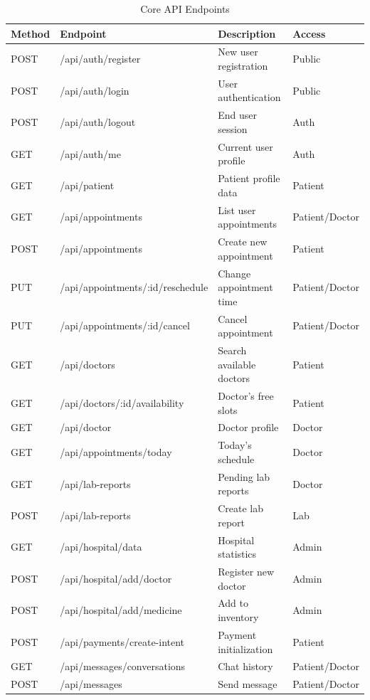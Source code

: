 \begin{table}[H]
\small
\centering
\caption{Core API Endpoints}
\label{tab:api-endpoints}
\renewcommand{\arraystretch}{1.3}
\begin{tabular}{|>{\raggedright\arraybackslash}p{1.6cm}|>{\raggedright\arraybackslash}p{5.1cm}|>{\raggedright\arraybackslash}p{4.2cm}|>{\raggedright\arraybackslash}p{2.9cm}|}
\hline
\textbf{Method} & \textbf{Endpoint} & \textbf{Description} & \textbf{Access} \\
\hline
POST & /api/auth/register & New user registration & Public \\
\hline
POST & /api/auth/login & User authentication & Public \\
\hline
POST & /api/auth/logout & End user session & Auth \\
\hline
GET & /api/auth/me & Current user profile & Auth \\
\hline
GET & /api/patient & Patient profile data & Patient \\
\hline
GET & /api/appointments & List user appointments & Patient/Doctor \\
\hline
POST & /api/appointments & Create new appointment & Patient \\
\hline
PUT & /api/appointments/:id/reschedule & Change appointment time & Patient/Doctor \\
\hline
PUT & /api/appointments/:id/cancel & Cancel appointment & Patient/Doctor \\
\hline
GET & /api/doctors & Search available doctors & Patient \\
\hline
GET & /api/doctors/:id/availability & Doctor's free slots & Patient \\
\hline
GET & /api/doctor & Doctor profile & Doctor \\
\hline
GET & /api/appointments/today & Today's schedule & Doctor \\
\hline
GET & /api/lab-reports & Pending lab reports & Doctor \\
\hline
POST & /api/lab-reports & Create lab report & Lab \\
\hline
GET & /api/hospital/data & Hospital statistics & Admin \\
\hline
POST & /api/hospital/add/doctor & Register new doctor & Admin \\
\hline
POST & /api/hospital/add/medicine & Add to inventory & Admin \\
\hline
POST & /api/payments/create-intent & Payment initialization & Patient \\
\hline
GET & /api/messages/conversations & Chat history & Patient/Doctor \\
\hline
POST & /api/messages & Send message & Patient/Doctor \\
\hline
\end{tabular}
\end{table}
